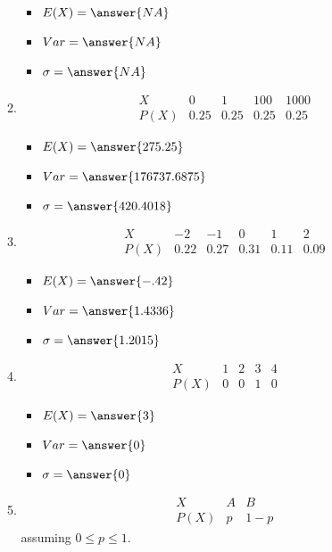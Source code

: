 \documentclass{ximera}
\begin{document}
\begin{enumerate}
\begin{enumerate}
\begin{itemize}
\item $E(X)=\answer{NA}$
\item $Var=\answer{NA}$
\item $\sigma=\answer{NA}$
\end{itemize}


\item $$
\begin{array}{c|cccc}
X & 0 & 1 & 100 & 1000\\
\hline
P(X) & 0.25 & 0.25 & 0.25 & 0.25
\end{array}
$$

\begin{itemize}
\item $E(X)=\answer{275.25}$
\item $Var=\answer{176737.6875}$
\item $\sigma=\answer{420.4018}$
\end{itemize}



\item $$
\begin{array}{c|ccccc}
X & -2 & -1 & 0 & 1 & 2\\
\hline
P(X) & 0.22 & 0.27 & 0.31 & 0.11 & 0.09
\end{array}
$$

\begin{itemize}
\item $E(X)=\answer{-.42}$
\item $Var=\answer{1.4336}$
\item $\sigma=\answer{1.2015}$
\end{itemize}



\item $$
\begin{array}{c|cccc}
X & 1 & 2 & 3 & 4\\
\hline
P(X) & 0 & 0 & 1 & 0
\end{array}
$$

\begin{itemize}
\item $E(X)=\answer{3}$
\item $Var=\answer{0}$
\item $\sigma=\answer{0}$
\end{itemize}



\item $$
\begin{array}{c|cc}
X & A & B  \\
\hline
P(X) & p & 1-p
\end{array}
$$ assuming $0\leq p\leq 1$.


\end{enumerate}
\end{enumerate}
\end{document}
